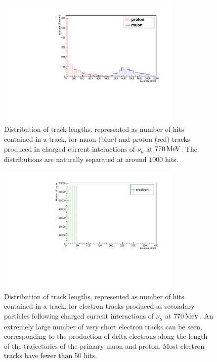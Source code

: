 \begin{figure}
\centering
\includegraphics[angle=-90,width=0.8\textwidth]{chapters/particleid_images/particle-lengths-ccqe-770}
\caption[Track length distribution for $\mu$ and $p$ from $770\MeV$ neutrinos (CCQE)]{\label{fig:ccqe-track-lengths-770MeV}Distribution of track lengths, represented as number of hits contained in a track, for muon (blue) and proton (red) tracks produced in charged current interactions of $\nu_\mu$ at $770\MeV$. The distributions are naturally separated at around $1000$ hits.}
\end{figure}

\begin{figure}
\centering
\includegraphics[angle=-90,width=0.8\textwidth]{chapters/particleid_images/electron-lengths-ccqe-770}
\caption[Track length distribution for $e^{-}$ from $770\MeV$ neutrinos (CCQE)]{\label{fig:ccqe-electron-lengths-770MeV}Distribution of track lengths, represented as number of hits contained in a track, for electron tracks produced as secondary particles following charged current interactions of $\nu_\mu$ at $770\MeV$. An extremely large number of very short electron tracks can be seen, corresponding to the production of delta electrons along the length of the trajectories of the primary muon and proton. Most electron tracks have fewer than 50 hits.}
\end{figure}

